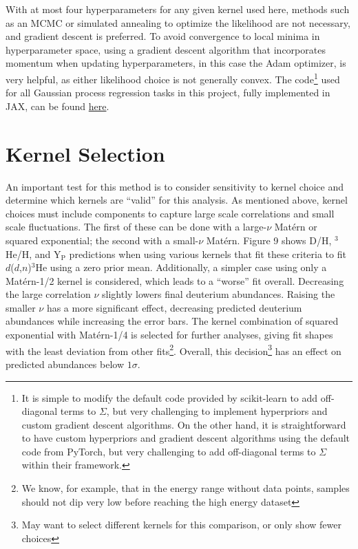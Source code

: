\documentclass[%
 reprint,
superscriptaddress,
nofootinbib,
 amsmath,amssymb,
 aps,
 pra,
]{revtex4-2}
\begin{document}
With at most four hyperparameters for any given kernel used here, methods such as an MCMC or simulated annealing to optimize the likelihood are not necessary, and gradient descent is preferred. To avoid convergence to local minima in hyperparameter space, using a gradient descent algorithm that incorporates momentum when updating hyperparameters, in this case the Adam optimizer, is very helpful, as either likelihood choice is not generally convex. The code\footnote{It is simple to modify the default code provided by scikit-learn to add off-diagonal terms to $\Sigma$, but very challenging to implement hyperpriors and custom gradient descent algorithms. On the other hand, it is straightforward to have custom hyperpriors and gradient descent algorithms using the default code from PyTorch, but very challenging to add off-diagonal terms to $\Sigma$ within their framework. \phantom{Some text to help with formatting.}} used for all Gaussian process regression tasks in this project, fully implemented in JAX, can be found \href{https://github.com/tim-launders/bbn_gaussian_processes}{here}.

\section{Kernel Selection}

An important test for this method is to consider sensitivity to kernel choice and determine which kernels are ``valid'' for this analysis. As mentioned above, kernel choices must include components to capture large scale correlations and small scale fluctuations. The first of these can be done with a large-$\nu$ Mat\'ern or squared exponential; the second with a small-$\nu$ Mat\'ern. Figure 9 shows D/H, $^3$He/H, and Y$_\text{P}$ predictions when using various kernels that fit these criteria to fit $d$($d$,$n$)$^3$He using a zero prior mean. Additionally, a simpler case using only a Mat\'ern-1/2 kernel is considered, which leads to a ``worse'' fit overall. Decreasing the large correlation $\nu$ slightly lowers final deuterium abundances. Raising the smaller $\nu$ has a more significant effect, decreasing predicted deuterium abundances while increasing the error bars. The kernel combination of squared exponential with Mat\'ern-1/4 is selected for further analyses, giving fit shapes with the least deviation from other fits\footnote{We know, for example, that in the energy range without data points, samples should not dip very low before reaching the high energy dataset}. Overall, this decision\footnote{May want to select different kernels for this comparison, or only show fewer choices} has an effect on predicted abundances below $1\sigma$.
\end{document}
